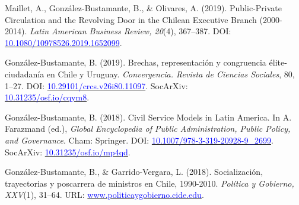 \begin{publications}
\begin{benumerate}{14}
\item{Maillet, A., González-Bustamante, B., \& Olivares, A. (2019). Public-Private Circulation and the Revolving Door in the Chilean Executive Branch (2000-2014). {\itshape Latin American Business Review, 20}(4), 367--387. DOI: \href{https://doi.org/10.1080/10978526.2019.1652099}{\textcolor{blue}{10.1080/10978526.2019.1652099}}.}\vspace{1mm}

\item{González-Bustamante, B. (2019). Brechas, representación y congruencia élite-ciudadanía en Chile y Uruguay. {\itshape Convergencia. Revista de Ciencias Sociales}, 80, 1--27. DOI: \href{https://doi.org/10.29101/crcs.v26i80.11097}{\textcolor{blue}{10.29101/crcs.v26i80.11097}}. SocArXiv: \\ \href{https://doi.org/10.31235/osf.io/cqym8}{\textcolor{blue}{10.31235/osf.io/cqym8}}.}\vspace{1mm} %

\item{González-Bustamante, B. (2018). Civil Service Models in Latin America. In A. Farazmand (ed.), {\itshape Global Encyclopedia of Public Administration, Public Policy, and Governance}. Cham: Springer. DOI: \href{https://doi.org/10.1007/978-3-319-20928-9\_2699}{\textcolor{blue}{10.1007/978-3-319-20928-9\_2699}}. SocArXiv: \href{https://doi.org/10.31235/osf.io/mp4qd}{\textcolor{blue}{10.31235/osf.io/mp4qd}}.}\vspace{1mm}

\item{González-Bustamante, B., \& Garrido-Vergara, L. (2018). Socialización, trayectorias y poscarrera de ministros en Chile, 1990-2010. {\itshape Política y Gobierno, XXV}(1), 31--64. URL: \href{http://www.politicaygobierno.cide.edu/index.php/pyg/article/view/1080}{\textcolor{blue}{www.politicaygobierno.cide.edu}}.}\vspace{1mm}

\end{benumerate}

\end{publications}

